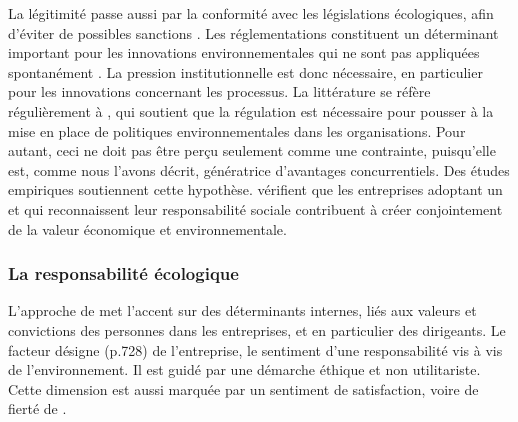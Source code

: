             La légitimité passe aussi par la conformité avec les législations écologiques, afin d'éviter de possibles sanctions \parencite{bansal2000why}. Les réglementations constituent un déterminant important pour les innovations environnementales qui ne sont pas appliquées spontanément \parencite{rennings2000redefining}. La pression institutionnelle est donc nécessaire, en particulier pour les innovations concernant les processus. La littérature se réfère régulièrement à , qui soutient que la régulation est nécessaire pour pousser à la mise en place de politiques environnementales dans les organisations. Pour autant, ceci ne doit pas être perçu seulement comme une contrainte, puisqu'elle est, comme nous l'avons décrit, génératrice d'avantages concurrentiels. Des études empiriques soutiennent cette hypothèse. \textcite{al-tuwaijri2003relations} vérifient que les entreprises adoptant un  et qui reconnaissent leur responsabilité sociale contribuent à créer conjointement de la valeur économique et environnementale.

        \subsubsection{La responsabilité écologique}
            L'approche de \textcite{bansal2000why} met l'accent sur des déterminants internes, liés aux valeurs et convictions des personnes dans les entreprises, et en particulier des dirigeants. Le facteur  désigne  (p.728) de l'entreprise, le sentiment d'une responsabilité vis à vis de l'environnement. Il est guidé par une démarche éthique et non utilitariste. Cette dimension est aussi marquée par un sentiment de satisfaction, voire de fierté de . \\

